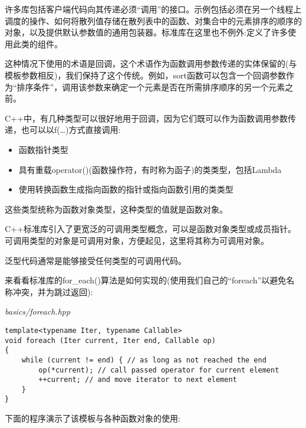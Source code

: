 
许多库包括客户端代码向其传递必须“调用”的接口。示例包括必须在另一个线程上调度的操作、如何将散列值存储在散列表中的函数、对集合中的元素排序的顺序的对象，以及提供默认参数值的通用包装器。标准库在这里也不例外:定义了许多使用此类的组件。

这种情况下使用的术语是回调，这个术语作为函数调用参数传递的实体保留的(与模板参数相反)，我们保持了这个传统。例如，sort函数可以包含一个回调参数作为“排序条件”，调用该参数来确定一个元素是否在所需排序顺序的另一个元素之前。

C++中，有几种类型可以很好地用于回调，因为它们既可以作为函数调用参数传递，也可以以f(…)方式直接调用:

\begin{itemize}
\item 
函数指针类型

\item 
具有重载operator()(函数操作符，有时称为函子)的类类型，包括Lambda

\item 
使用转换函数生成指向函数的指针或指向函数引用的类类型
\end{itemize}

这些类型统称为函数对象类型，这种类型的值就是函数对象。

C++标准库引入了更宽泛的可调用类型概念，可以是函数对象类型或成员指针。可调用类型的对象是可调用对象，方便起见，这里将其称为可调用对象。

泛型代码通常是能够接受任何类型的可调用代码。


来看看标准库的for\_each()算法是如何实现的(使用我们自己的“foreach”以避免名称冲突，并为跳过返回):

\noindent
\textit{basics/foreach.hpp}
\begin{lstlisting}[style=styleCXX]
template<typename Iter, typename Callable>
void foreach (Iter current, Iter end, Callable op)
{
	while (current != end) { // as long as not reached the end
		op(*current); // call passed operator for current element
		++current; // and move iterator to next element
	}
}
\end{lstlisting}

下面的程序演示了该模板与各种函数对象的使用:

